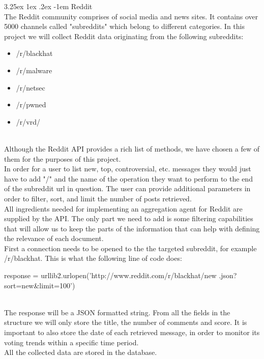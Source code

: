 \documentclass[12pt]{article}
\makeatletter
\renewcommand\paragraph{\@startsection{paragraph}{5}{\z@}%
  {3.25ex \@plus1ex \@minus.2ex}%
  {-1em}%
  {\normalfont\normalsize\bfseries}}
\makeatother
\begin{document}
\paragraph{Reddit}
\hfill \break
\\
The Reddit community comprises of social media and news sites. It contains over 5000 channels called "subreddits" which belong to different categories. In this project we will collect Reddit \cite{reddit} data originating from the following subreddits:
\begin{itemize}
\item /r/blackhat \cite{r.blackhat}
\item /r/malware \cite{r.malware}
\item /r/netsec \cite{r.netsec}
\item /r/pwned \cite{r.pwned}
\item /r/vrd/ \cite{r.rvd}

\end{itemize}
\hfill \break
\\
Although the Reddit API \cite{reddit} provides a rich list of methods, we have chosen a few of them for the purposes of this project.\\
\hfill \break
In order for a user to list new, top, controversial, etc. messages they would just have to add "/" and the name of the operation they want to perform to the end of the subreddit url in question. The user can provide additional parameters in order to filter, sort, and limit the number of posts retrieved. 
\hfill \break
\\
All ingredients needed for implementing an aggregation agent for Reddit are supplied by the API. The only part we need to add is some filtering capabilities that will allow us to keep the parts of the information that can help with defining the relevance of each document.
\hfill \break
\\
First a connection needs to be opened to the the targeted subreddit, for example /r/blackhat. This is what the following line of code does:

\begin{spverbatim}
response = urllib2.urlopen('http://www.reddit.com/r/blackhat/new
			.json?sort=new&limit=100')
\end{spverbatim}
\hfill \break
\\
The response will be a JSON formatted string. From all the fields in the structure we will only store the title, the number of comments and score. It is important to also store the date of each retrieved message, in order to monitor its voting trends within a specific time period.
\hfill \break
\\
All the collected data are stored in the database. 
\end{document}
